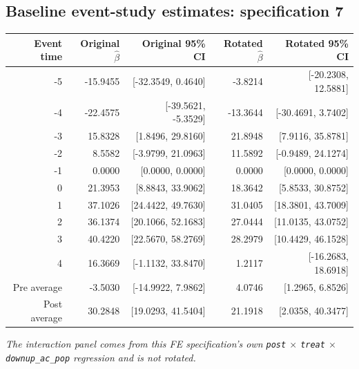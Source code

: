\documentclass[10pt]{article}
\begin{document}
\subsection*{Baseline event-study estimates: specification 7}
\begin{center}
\scriptsize
\begin{tabular}{r rr rr}
\toprule
Event time & Original $\hat\beta$ & Original 95\% CI & Rotated $\hat\beta$ & Rotated 95\% CI \\
\midrule
-5 & -15.9455 & [-32.3549, 0.4640] & -3.8214 & [-20.2308, 12.5881] \\
-4 & -22.4575 & [-39.5621, -5.3529] & -13.3644 & [-30.4691, 3.7402] \\
-3 & 15.8328 & [1.8496, 29.8160] & 21.8948 & [7.9116, 35.8781] \\
-2 & 8.5582 & [-3.9799, 21.0963] & 11.5892 & [-0.9489, 24.1274] \\
-1 & 0.0000 & [0.0000, 0.0000] & 0.0000 & [0.0000, 0.0000] \\
0 & 21.3953 & [8.8843, 33.9062] & 18.3642 & [5.8533, 30.8752] \\
1 & 37.1026 & [24.4422, 49.7630] & 31.0405 & [18.3801, 43.7009] \\
2 & 36.1374 & [20.1066, 52.1683] & 27.0444 & [11.0135, 43.0752] \\
3 & 40.4220 & [22.5670, 58.2769] & 28.2979 & [10.4429, 46.1528] \\
4 & 16.3669 & [-1.1132, 33.8470] & 1.2117 & [-16.2683, 18.6918] \\
\midrule
Pre average & -3.5030 & [-14.9922, 7.9862] & 4.0746 & [1.2965, 6.8526] \\
Post average & 30.2848 & [19.0293, 41.5404] & 21.1918 & [2.0358, 40.3477] \\
\bottomrule
\end{tabular}
\end{center}
\medskip
\textit{The interaction panel comes from this FE specification's own \texttt{post} $\times$ \texttt{treat} $\times$ \texttt{downup\_ac\_pop} regression and is not rotated.}
\clearpage
\end{document}
